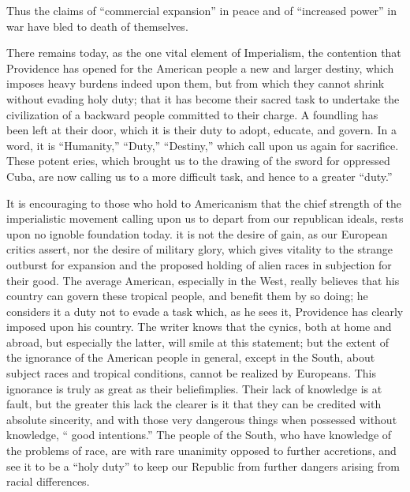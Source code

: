 \documentclass[11pt,openany]{book}
\begin{document}
Thus the claims of ``commercial expansion'' in peace and of ``increased power'' in war have bled to death of themselves.

There remains today, as the one vital element of Imperialism, the contention that Providence has opened for the American people a new and larger destiny, which imposes heavy burdens indeed upon them, but from which they cannot shrink without evading holy duty; that it has become their sacred task to undertake the civilization of a backward people committed to their charge. A foundling has been left at their door, which it is their duty to adopt, educate, and govern. In a word, it is ``Humanity,'' ``Duty,'' ``Destiny,'' which call upon us again for sacrifice. These potent eries, which brought us to the drawing of the sword for oppressed Cuba, are now calling us to a more difficult task, and hence to a greater ``duty.''

It is encouraging to those who hold to Americanism that the chief strength of the imperialistic movement calling upon us to depart from our republican ideals, rests upon no ignoble foundation today. it is not the desire of gain, as our European critics assert, nor the desire of military glory, which gives vitality to the strange outburst for expansion and the proposed holding of alien races in subjection for their good. The average American, especially in the West, really believes that his country can govern these tropical people, and benefit them by so doing; he considers it a duty not to evade a task which, as he sees it, Providence has clearly imposed upon his country. The writer knows that the cynics, both at home and abroad, but especially the latter, will smile at this statement; but the extent of the ignorance of the American people in general, except in the South, about subject races and tropical conditions, cannot be realized by Europeans. This ignorance is truly as great as their beliefimplies. Their lack of knowledge is at fault, but the greater this lack the clearer is it that they can be credited with absolute sincerity, and with those very dangerous things when possessed without knowledge, `` good intentions.'' The people of the South, who have knowledge of the problems of race, are with rare unanimity opposed to further accretions, and see it to be a ``holy duty'' to keep our Republic from further dangers arising from racial differences.
\end{document}
